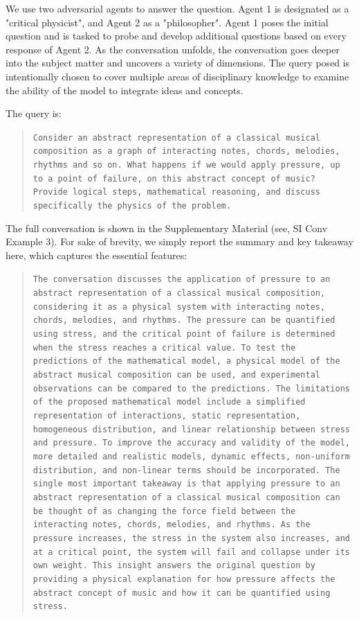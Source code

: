 \documentclass{article}
\begin{document}
We use two adversarial agents to answer the question. Agent 1 is designated as a "critical physicist", and Agent 2 as a "philosopher". Agent 1 poses the initial question and is tasked to probe and develop additional questions based on every response of Agent 2. As the conversation unfolds, the conversation goes deeper into the subject matter and uncovers a variety of dimensions.  The query posed is intentionally chosen to cover multiple areas of disciplinary knowledge to examine the ability of the model to integrate ideas and concepts. 

The query is:
\begin{quote}
\small\texttt{Consider an abstract representation of a classical musical composition as a graph of
interacting notes, chords, melodies, rhythms and so on.
\newline\newline
What happens if we would apply pressure, up to a point of failure, on this abstract concept of music?
\newline\newline
Provide logical steps, mathematical reasoning, and discuss specifically the physics of the problem.}
\end{quote}
The full conversation is shown in the Supplementary Material (see, SI Conv Example 3). For sake of brevity, we simply report the summary and key takeaway here, which captures the essential features:
\begin{quote}
\small\texttt{The conversation discusses the application of pressure to an abstract representation of a classical musical composition,
considering it as a physical system with interacting notes, chords, melodies, and rhythms. The pressure can be
quantified using stress, and the critical point of failure is determined when the stress reaches a critical value. To test
the predictions of the mathematical model, a physical model of the abstract musical composition can be used, and
experimental observations can be compared to the predictions. The limitations of the proposed mathematical model
include a simplified representation of interactions, static representation, homogeneous distribution, and linear
relationship between stress and pressure. To improve the accuracy and validity of the model, more detailed and
realistic models, dynamic effects, non-uniform distribution, and non-linear terms should be incorporated. 
\newline\newline
[...]
\newline\newline
The single most important takeaway is that applying pressure to an abstract representation of a classical
musical composition can be thought of as changing the force field between the interacting notes, chords,
melodies, and rhythms. As the pressure increases, the stress in the system also increases, and at a critical
point, the system will fail and collapse under its own weight. This insight answers the original question by
providing a physical explanation for how pressure affects the abstract concept of music and how it can be
quantified using stress.}
\end{quote}
\end{document}
